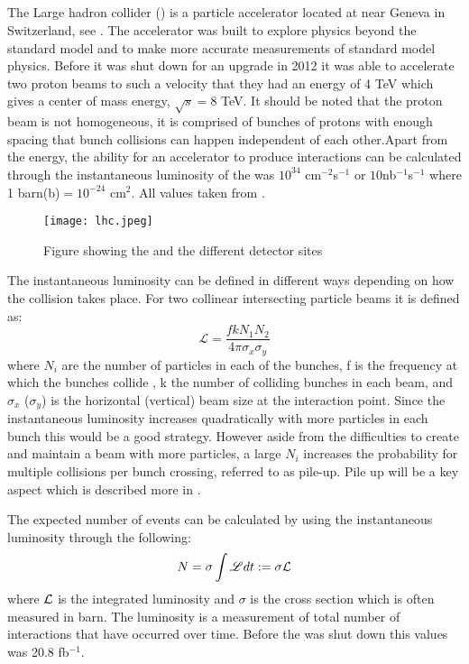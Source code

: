 \subsection{\abbrLHC}
The Large hadron collider (\abbrLHC) is a particle accelerator located at \abbrCERN near Geneva in Switzerland, see . The accelerator was built to explore physics beyond the standard model and to make more accurate measurements of standard model physics. Before it was shut down for an upgrade in 2012 it was able to accelerate two proton beams to such a velocity that they had an energy of 4 TeV which gives a center of mass energy, $\sqrt{s}=8$ TeV. It should be noted that the proton beam is not homogeneous, it is comprised of bunches of protons with enough spacing that bunch collisions can happen independent of each other.Apart from the energy, the ability for an accelerator to produce interactions can be calculated through the instantaneous luminosity of the \abbrLHC was $10^{34}$ cm$^{-2}$s$^{-1}$ or $10$nb$^{-1}$s$^{-1}$ where 1 barn(b)$=10^{-24}$ cm$^2$. All values taken from \citep{lumires}.
\begin{figure}[H]
\begin{center}
\texttt{[image: lhc.jpeg]}
\caption{Figure showing the \abbrLHC and the different detector sites\citep{lhcimage}}
\label{fig:lhc}
\end{center}
\end{figure}
The instantaneous luminosity can be defined in different ways depending on how the collision takes place. For two collinear intersecting particle beams it is defined as:
\begin{equation}
\mathscr{L} = \frac{fkN_1 N_2}{4\pi \sigma_x \sigma_y}
\end{equation}
where $N_i$ are the number of particles in each of the bunches, f is the frequency at which the bunches collide , k the number of colliding bunches in each beam, and $\sigma_x$ ($\sigma_y$) is the horizontal (vertical) beam size at the interaction point. Since the instantaneous luminosity increases quadratically with more particles in each bunch this would be a good strategy. However aside from the difficulties to create and maintain a beam with more particles, a large $N_i$ increases the probability for multiple collisions per bunch crossing, referred to as pile-up. Pile up will be a key aspect which is described more in . 

The expected number of events can be calculated by using the instantaneous luminosity through the following:
\begin{equation}
N=\sigma \int \mathscr{L} dt := \sigma \mathcal{L}
\end{equation}
where $\mathcal{L}$ is the integrated luminosity and $\sigma$ is the cross section which is often measured in barn.
The luminosity is a measurement of total number of interactions that have occurred over time. Before the \abbrLHC was shut down this values was 20.8 fb$^{-1}$.

